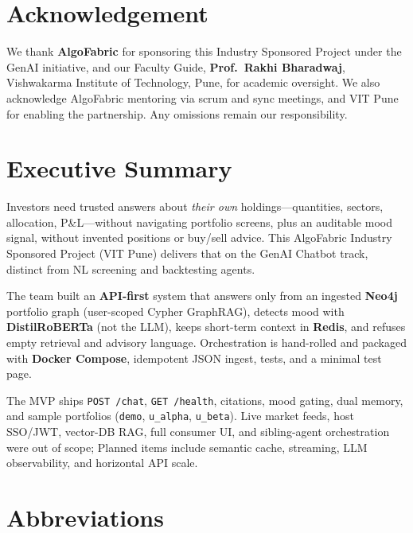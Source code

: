 \documentclass[12pt,a4paper]{report}
\begin{document}
\chapter*{Acknowledgement}

\noindent
We thank \textbf{AlgoFabric} for sponsoring this Industry Sponsored Project under the GenAI initiative, and our Faculty Guide, \textbf{Prof.\ Rakhi Bharadwaj}, Vishwakarma Institute of Technology, Pune, for academic oversight. We also acknowledge AlgoFabric mentoring via scrum and sync meetings, and VIT Pune for enabling the partnership. Any omissions remain our responsibility.

\chapter*{Executive Summary}

\noindent
Investors need trusted answers about \emph{their own} holdings---quantities, sectors, allocation, P\&L---without navigating portfolio screens, plus an auditable mood signal, without invented positions or buy/sell advice. This AlgoFabric Industry Sponsored Project (VIT Pune) delivers that on the GenAI Chatbot track, distinct from NL screening and backtesting agents.

\vspace{0.85em}
\noindent
The team built an \textbf{API-first} system that answers only from an ingested \textbf{Neo4j} portfolio graph (user-scoped Cypher GraphRAG), detects mood with \textbf{DistilRoBERTa} (not the LLM), keeps short-term context in \textbf{Redis}, and refuses empty retrieval and advisory language. Orchestration is hand-rolled and packaged with \textbf{Docker Compose}, idempotent JSON ingest, tests, and a minimal test page.

\vspace{0.85em}
\noindent
The MVP ships \texttt{POST /chat}, \texttt{GET /health}, citations, mood gating, dual memory, and sample portfolios (\texttt{demo}, \texttt{u\_alpha}, \texttt{u\_beta}). Live market feeds, host SSO/JWT, vector-DB RAG, full consumer UI, and sibling-agent orchestration were out of scope; Planned items include semantic cache, streaming, LLM observability, and horizontal API scale.

\tableofcontents
\newpage

\chapter*{Abbreviations}
\end{document}
